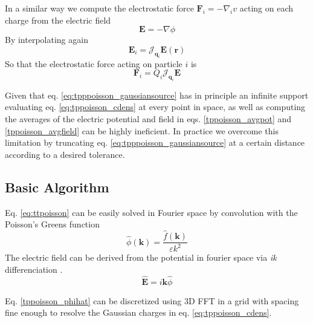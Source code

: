 \documentclass[ twoside,openright,titlepage,numbers=noenddot,%
headinclude,footinclude,cleardoublepage=empty,abstract=on,
BCOR=5mm,paper=a4,fontsize=11pt, dvipsnames
]{scrreprt}
\renewcommand{\vec}[1]{\bm{#1}}
\newcommand{\oper}[1]{\mathcal{#1}}
\newcommand{\ppos}{q}
\newcommand{\fpos}{r}
\newcommand{\fvel}{v}
\begin{document}
In a similar way we compute the electrostatic force $\vec{F}_i = -\nabla_i{\fvel}$ acting on each charge from the electric field
\begin{equation}
  \vec{E} = -\nabla{\phi}
\end{equation}
By interpolating again
\begin{equation}
  \label{tppoisson_avgfield}
\vec{E}_i = \oper{J}_{\vec{\ppos}_i}\vec{E}(\vec{\fpos})
\end{equation}
So that the electrostatic force acting on particle $i$ is
\begin{equation}
\vec{F}_i = Q_i\oper{J}_{\vec{\ppos}_i}\vec{E}
\end{equation}

Given that eq. \eqref{eq:tpppoisson_gaussiansource} has in principle an infinite support evaluating eq. \eqref{eq:tppoisson_cdens} at every point in space, as well as computing the averages of the electric potential and field in eqs. \eqref{tppoisson_avgpot} and \eqref{tppoisson_avgfield} can be highly ineficient. In practice we overcome this limitation by truncating eq. \eqref{eq:tpppoisson_gaussiansource} at a certain distance according to a desired tolerance.
\subsection*{Basic Algorithm}
Eq. \eqref{eq:ttpoisson} can be easily solved in Fourier space by convolution with the Poisson's Greens function 
\begin{equation}
  \label{tppoisson_phihat}
 \hat\phi(\vec{k}) = \frac{\hat f(\vec{k})}{\varepsilon k^2}
\end{equation}   
The electric field can be derived from the potential in fourier space via \emph{ik} differenciation \cite{ikdiff}.
\begin{equation}
    \label{tppoisson_ehat}
  \hat{\vec{E}} = i\vec{k}\hat{\phi}
\end{equation}

Eq. \eqref{tppoisson_phihat} can be discretized using 3D \gls{FFT} in a grid with spacing fine enough to resolve the Gaussian charges in eq. \eqref{eq:tppoisson_cdens}.
\end{document}
